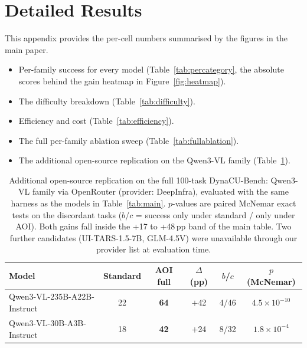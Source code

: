 \documentclass[11pt]{article}
\begin{document}
\clearpage

\appendix
\section{Detailed Results}
\label{app:detailed}
\label{app:fullresults}

This appendix provides the per-cell numbers summarised by the figures in the main paper.
\begin{itemize}
  \item Per-family success for every model (Table~\ref{tab:percategory}, the
absolute scores behind the gain heatmap in Figure~\ref{fig:heatmap}).
\item The difficulty breakdown (Table~\ref{tab:difficulty}).
\item Efficiency and cost (Table~\ref{tab:efficiency}).
\item The full per-family ablation sweep (Table~\ref{tab:fullablation}).
\item The additional open-source replication on the Qwen3-VL family (Table~\ref{tab:b1_oss}).
\end{itemize}

\begin{table}[!h]
\centering
\caption{Additional open-source replication on the full 100-task
DynaCU-Bench: Qwen3-VL family via OpenRouter (provider: DeepInfra), evaluated with the same
harness as the models in Table~\ref{tab:main}. $p$-values are
paired McNemar exact tests on the discordant tasks ($b$/$c$ = success
only under standard / only under AOI). Both gains fall inside the
+17 to +48\,pp band of the main table. Two further candidates (UI-TARS-1.5-7B,
GLM-4.5V) were unavailable through our provider list at evaluation time.}
\label{tab:b1_oss}
\small
\begin{tabular}{@{}l cc cc c@{}}
\toprule
\textbf{Model} & \textbf{Standard} & \textbf{AOI full}
& \textbf{$\Delta$ (pp)} & \textbf{$b$/$c$} & \textbf{$p$ (McNemar)} \\
\midrule
Qwen3-VL-235B-A22B-Instruct & 22 & \textbf{64} & $+$42 & 4/46 & $4.5\times10^{-10}$ \\
Qwen3-VL-30B-A3B-Instruct   & 18 & \textbf{42} & $+$24 & 8/32 & $1.8\times10^{-4}$ \\
\bottomrule
\end{tabular}
\end{table}
\end{document}

